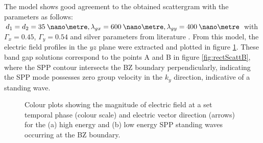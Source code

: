The model shows good agreement to the obtained scattergram with the parameters as follows: $d_1=d_2=35\:\nano\metre, \lambda_{gx}=600\:\nano\metre, \lambda_{gy}=400\:\nano\metre$ with $\Gamma_x=0.45$, $\Gamma_y=0.54$ and silver parameters from literature \cite{Palik1985}. From this model, the electric field profiles in the $yz$ plane were extracted and plotted in figure \ref{fig:rectfieldbandgaps}. These band gap solutions correspond to the points A and B in figure \ref{fig:rectScattB}, where the SPP contour intersects the BZ boundary perpendicularly, indicating the SPP mode possesses zero group velocity in the $k_y$ direction, indicative of a standing wave.

\begin{figure}
\begin{center}
\end{center}
\caption[Plots showing the electric field for the high energy and low energy SPP standing waves occurring at the BZ boundary.]{Colour plots showing the magnitude of electric field at a set temporal phase (colour scale) and electric vector direction (arrows) for the (a) high energy and (b) low energy SPP standing waves occurring at the BZ boundary.\label{fig:rectfieldbandgaps}}
\end{figure}

